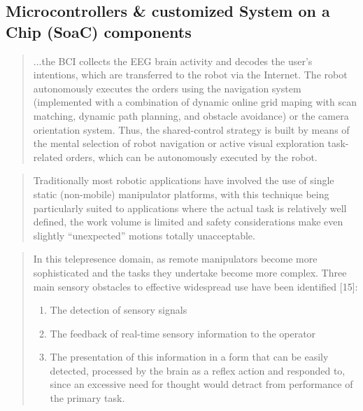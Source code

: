 \documentclass[a4paper,12pt]{report}
\begin{document}
\subsection{Microcontrollers \& customized System on a Chip (SoaC) components}

\begin{quotation}{
	...the BCI collects the EEG brain activity and decodes the user's intentions, which are transferred to the robot via the Internet. The robot autonomously executes the orders using the navigation system (implemented with a combination of dynamic online grid maping with scan matching, dynamic path planning, and obstacle avoidance) or the camera orientation system. Thus, the shared-control strategy is built by means  of the mental selection of robot navigation or active visual exploration task-related orders, which can be autonomously executed by the robot.}
	\begin{flushright}
		\cite{6104414}
	\end{flushright}
\end{quotation}
\begin{quote}
	Traditionally most robotic applications have involved the use of single static (non-mobile) manipulator platforms, with this technique being particularly suited to applications where the actual task is relatively well defined, the work volume is limited and safety considerations make even slightly “unexpected” motions totally unacceptable.
	\begin{flushright}
		\cite{540147}
	\end{flushright}
\end{quote}
\begin{quote}
In this telepresence domain, as remote manipulators become more sophisticated and the tasks they undertake become more complex. Three main sensory obstacles to effective widespread use have been identified [15]:
	\begin{enumerate}
		\item The detection of sensory signals
		\item The feedback of real-time sensory information to the operator
		\item The presentation of this information in a form that can be easily detected, processed by the brain as a reflex action and responded to, since an excessive need for thought would detract from performance of the primary task.
	\end{enumerate}
	\begin{flushright}
		\cite{540147}
	\end{flushright}
\end{quote}
\end{document}
